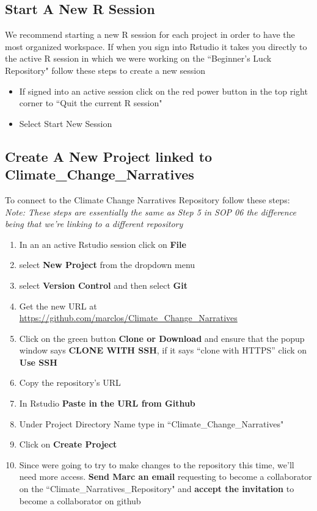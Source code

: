 \documentclass{article}\usepackage[]{graphicx}\usepackage[]{color}
\begin{document}
\subsection{Start A New R Session}
We recommend starting a new R session for each project in order to have the most organized workspace. If when you sign into Rstudio it takes you directly to the active R session in which we were working on the ``Beginner's Luck Repository" follow these steps to create a new session

  \begin{itemize}
  \item If signed into an active session click on the red power button in the top right corner to ``Quit the current R session"
  \item Select Start New Session
  \end{itemize}

\subsection{Create A New Project linked to Climate\_Change\_Narratives}
To connect to the Climate Change Narratives Repository follow these steps:\\
\emph{Note: These steps are essentially the same as Step 5 in SOP 06 the difference being that we're linking to a different repository} \\

\begin{enumerate}
  \item In an an active Rstudio session click on \textbf{File}
  \item select \textbf{New Project} from the dropdown menu
  \item select \textbf{Version Control} and then select \textbf{Git}
  \item Get the new URL at \url{https://github.com/marclos/Climate_Change_Narratives}
  \item Click on the green button \textbf{Clone or Download} and ensure that the popup window says \textbf{CLONE WITH SSH}, if it says ``clone with HTTPS'' click on \textbf{Use SSH} 
  \item Copy the repository's URL 
  \item In Rstudio \textbf{Paste in the URL from Github}
  \item Under Project Directory Name type in ``Climate\_Change\_Narratives"
  \item Click on \textbf{Create Project} 
  \item Since were going to try to make changes to the repository this time, we'll need more access. \textbf{Send Marc an email} requesting to become a collaborator on the ``Climate\_Narratives\_Repository" and \textbf{accept the invitation} to become a collaborator on github
  \end{enumerate} 
\end{document}
